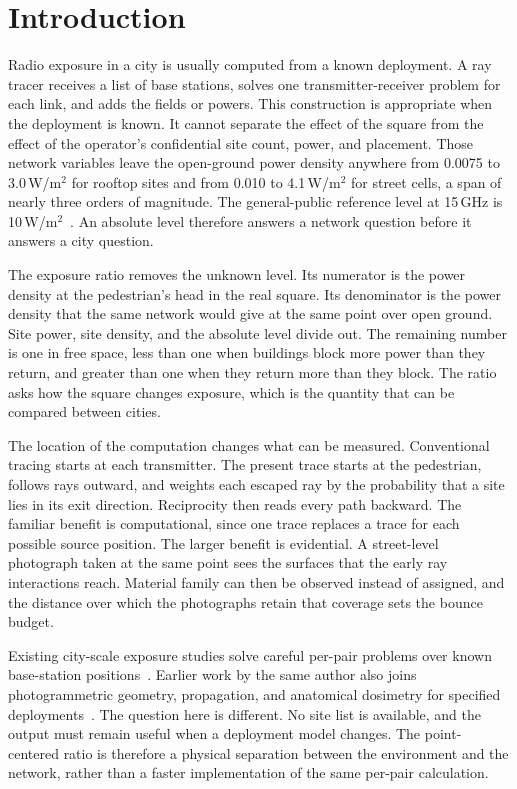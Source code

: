 \documentclass[journal]{IEEEtran}
\begin{document}
\section{Introduction}
\label{sec:introduction}

Radio exposure in a city is usually computed from a known deployment. A ray
tracer receives a list of base stations, solves one transmitter-receiver problem
for each link, and adds the fields or powers. This construction is appropriate
when the deployment is known. It cannot separate the effect of the square from
the effect of the operator's confidential site count, power, and placement.
Those network variables leave the open-ground power density anywhere from 0.0075
to 3.0\,W/m$^2$ for rooftop sites and from 0.010 to 4.1\,W/m$^2$ for street
cells, a span of nearly three orders of magnitude. The general-public reference level at
15\,GHz is 10\,W/m$^2$~\cite{icnirp}. An absolute level therefore answers a
network question before it answers a city question.

The exposure ratio removes the unknown level. Its numerator is the power density
at the pedestrian's head in the real square. Its denominator is the power density
that the same network would give at the same point over open ground. Site power,
site density, and the absolute level divide out. The remaining number is one in
free space, less than one when buildings block more power than they return, and
greater than one when they return more than they block. The ratio asks how the square changes
exposure, which is the quantity that can be compared between cities.

The location of the computation changes what can be measured. Conventional
tracing starts at each transmitter. The present trace starts at the pedestrian,
follows rays outward, and weights each escaped ray by the probability that a
site lies in its exit direction. Reciprocity then reads every path backward.
The familiar benefit is computational, since one trace replaces a trace for
each possible source position. The larger benefit is evidential. A street-level
photograph taken at the same point sees the surfaces that the early ray
interactions reach. Material family can then be observed instead of assigned,
and the distance over which the photographs retain that coverage sets the
bounce budget.

Existing city-scale exposure studies solve careful per-pair problems over known
base-station positions~\cite{leeman}. Earlier work by the same author also joins
photogrammetric geometry, propagation, and anatomical dosimetry for specified
deployments~\cite{wydaeghe2026}. The question here is different. No site list is
available, and the output must remain useful when a deployment model changes.
The point-centered ratio is therefore a physical separation between the
environment and the network, rather than a faster implementation of the same
per-pair calculation.
\end{document}
